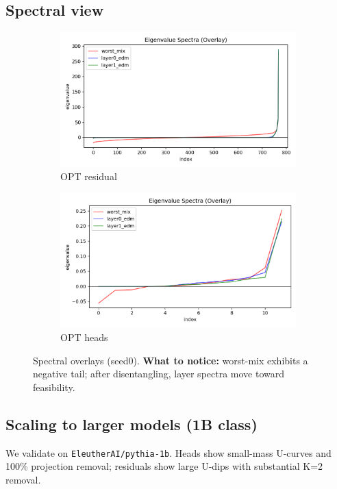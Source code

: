 \documentclass[11pt]{article}
\newcommand{\1}{\mathbf{1}}
\begin{document}
\subsection{Spectral view}
\begin{figure}[t]
\centering
\begin{subfigure}[t]{0.48\textwidth}
\includegraphics[width=\linewidth]{figs/spectrum_overlay_facebook_opt-125m_residual_seed0.png}
\caption{OPT residual}
\end{subfigure}\hfill
\begin{subfigure}[t]{0.48\textwidth}
\includegraphics[width=\linewidth]{figs/spectrum_overlay_facebook_opt-125m_heads_seed0.png}
\caption{OPT heads}
\end{subfigure}
\caption{Spectral overlays (seed0). \textbf{What to notice:} worst-mix exhibits a negative tail; after disentangling, layer spectra move toward feasibility.}
\label{fig:spectra}
\end{figure}

\subsection{Scaling to larger models (1B class)} \label{sec:scaling}
We validate on \texttt{EleutherAI/pythia-1b}. Heads show small-mass U-curves and 100\% projection removal; residuals show large U-dips with substantial K{=}2 removal.
\end{document}
